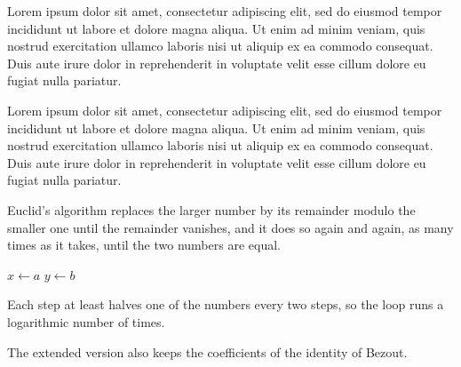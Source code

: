 \documentclass{article}
\begin{document}
Lorem ipsum dolor sit amet, consectetur adipiscing elit, sed do eiusmod tempor incididunt ut labore et dolore magna aliqua. Ut enim ad minim veniam, quis nostrud exercitation ullamco laboris nisi ut aliquip ex ea commodo consequat. Duis aute irure dolor in reprehenderit in voluptate velit esse cillum dolore eu fugiat nulla pariatur.

Lorem ipsum dolor sit amet, consectetur adipiscing elit, sed do eiusmod tempor incididunt ut labore et dolore magna aliqua. Ut enim ad minim veniam, quis nostrud exercitation ullamco laboris nisi ut aliquip ex ea commodo consequat. Duis aute irure dolor in reprehenderit in voluptate velit esse cillum dolore eu fugiat nulla pariatur.

Euclid's algorithm replaces the larger number by its remainder modulo the smaller one until the remainder vanishes, and it does so again and again, as many times as it takes, until the two numbers are equal.
\begin{algorithm}[H]
\begin{algorithmic}
\State $x \gets a$
\State $y \gets b$
\end{algorithmic}
\end{algorithm}

Each step at least halves one of the numbers every two steps, so the loop runs a logarithmic number of times.

The extended version also keeps the coefficients of the identity of Bezout.
\end{document}
